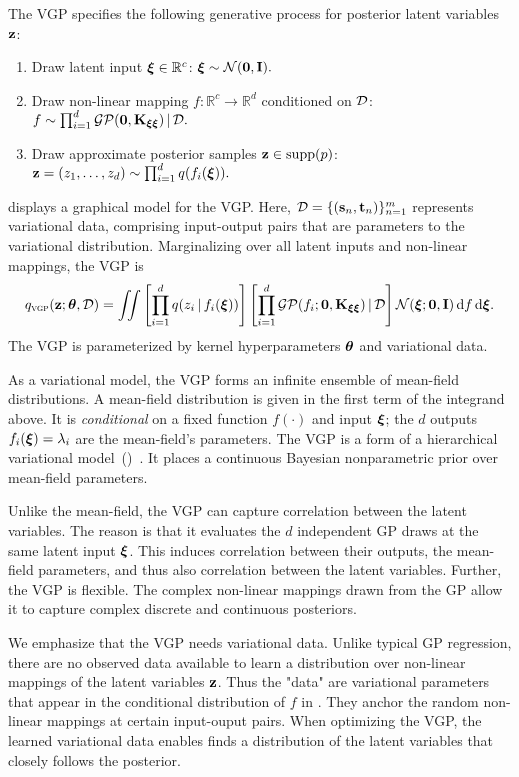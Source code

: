 The \gls{VGP} specifies the following
generative process for posterior latent variables $\boldsymbol{\mathbf{z}}$:
\begin{enumerate}
\item Draw latent input $\boldsymbol{\mathbf{\xi}} \in \mathbb{R}^c$:
$\boldsymbol{\mathbf{\xi}}\sim\mathcal{N}(\boldsymbol{\mathbf{0}},\boldsymbol{\mathbf{I}}).$
\item Draw non-linear mapping $f: \mathbb{R}^c\to\mathbb{R}^d$ conditioned on $\mathcal{D}$:
$f\sim \prod_{i=1}^d\mathcal{GP}(\boldsymbol{\mathbf{0}}, \mathbf{K}_{\boldsymbol{\mathbf{\xi}}\boldsymbol{\mathbf{\xi}}}) \,|\, \mathcal{D}.$
\item Draw approximate posterior samples $\boldsymbol{\mathbf{z}}\in\operatorname{supp}(p)$:
$\boldsymbol{\mathbf{z}}=(z_1,\ldots,z_d)\sim \prod_{i=1}^d
q(f_i(\boldsymbol{\mathbf{\xi}}) ).$
\end{enumerate}
 displays a graphical model for the \gls{VGP}.
Here, $\mathcal{D}=\{(\mathbf{s}_n,\mathbf{t}_n)\}_{n=1}^m$ represents variational data, comprising
input-output pairs that are parameters to the variational
distribution.
Marginalizing over all latent inputs and non-linear mappings, the
\gls{VGP} is
\begin{equation}
q_{\textsc{vgp}}(\boldsymbol{\mathbf{z}}; \boldsymbol{\mathbf{\theta}}, \mathcal{D})
=
\iint
\left[
\prod_{i=1}^d q(z_i\,|\, f_i(\boldsymbol{\mathbf{\xi}}))
\right]
\left[
\prod_{i=1}^d \mathcal{GP}(f_i; \boldsymbol{\mathbf{0}}, \mathbf{K}_{\boldsymbol{\mathbf{\xi}}\boldsymbol{\mathbf{\xi}}}) \,|\, \mathcal{D}
\right]
\mathcal{N}(\boldsymbol{\mathbf{\xi}}; \boldsymbol{\mathbf{0}},\boldsymbol{\mathbf{I}})
\operatorname{d}\!{f} \operatorname{d}\!{\boldsymbol{\mathbf{\xi}}}.
\label{eq:vgp}
\end{equation}
The \gls{VGP} is parameterized by kernel hyperparameters $\boldsymbol{\mathbf{\theta}}$ and
variational data.

As a variational model, the \gls{VGP} forms an infinite ensemble of
mean-field distributions. A mean-field distribution is given in the
first term of the integrand above. It is
\emph{conditional} on a fixed function $f(\cdot)$ and input $\boldsymbol{\mathbf{\xi}}$;
the $d$ outputs $f_i(\boldsymbol{\mathbf{\xi}})=\lambda_i$ are the mean-field's
parameters. The \gls{VGP} is a form of a hierarchical variational
model~()~\citep{ranganath2015hierarchical}. It places a continuous
Bayesian nonparametric prior over mean-field parameters.

Unlike the mean-field, the \gls{VGP} can capture correlation between the
latent variables. The reason is that it evaluates the $d$ independent
\gls{GP} draws at the same latent input $\boldsymbol{\mathbf{\xi}}$. This induces
correlation between their outputs, the mean-field parameters, and thus
also correlation between the latent variables. Further, the \gls{VGP} is
flexible. The complex non-linear mappings drawn from the \gls{GP}
allow it to capture complex discrete and continuous posteriors.

We emphasize that the \gls{VGP} needs variational data. Unlike typical
\gls{GP} regression, there are no observed data available to learn a
distribution over non-linear mappings of the latent variables $\boldsymbol{\mathbf{z}}$.
Thus the "data" are variational parameters that appear in the
conditional distribution of $f$ in . They anchor
the random non-linear mappings at certain input-ouput pairs. When
optimizing the \gls{VGP}, the learned variational data enables finds a
distribution of the latent variables that closely follows the
posterior.

